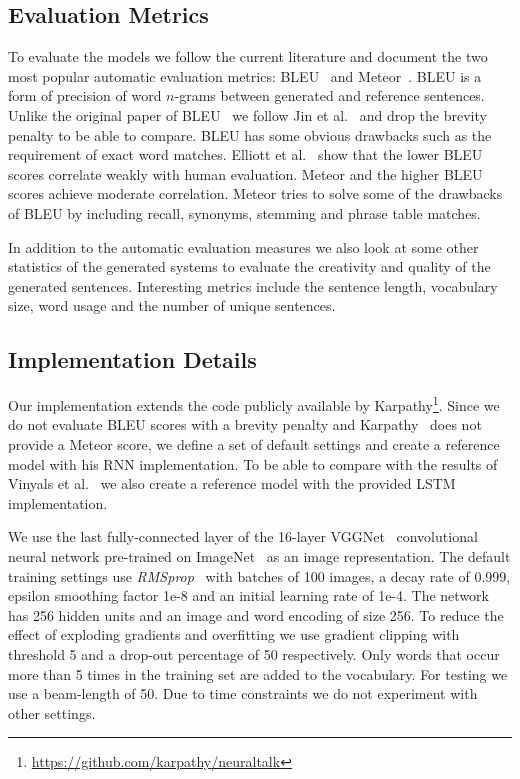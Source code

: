 \documentclass[twoside,twocolumn]{article}
\begin{document}
	\subsection{Evaluation Metrics}
	To evaluate the models we follow the current literature and document the two most popular automatic evaluation metrics: BLEU~\cite{Papineni2002} and Meteor~\cite{Denkowski2007a}. BLEU is a form of precision of word $n$-grams between generated and reference sentences. Unlike the original paper of BLEU~\cite{Papineni2002} we follow Jin et al.~\cite{Jin2015} and drop the brevity penalty to be able to compare. BLEU has some obvious drawbacks such as the requirement of exact word matches. Elliott et al.~\cite{Elliott2014} show that the lower BLEU scores correlate weakly with human evaluation. Meteor and the higher BLEU scores achieve moderate correlation. Meteor tries to solve some of the drawbacks of BLEU by including recall, synonyms, stemming and phrase table matches.
	
	In addition to the automatic evaluation measures we also look at some other statistics of the generated systems to evaluate the creativity and quality of the generated sentences.
	Interesting metrics include the sentence length, vocabulary size, word usage and the number of unique sentences.
	
	\subsection{Implementation Details}
	
	Our implementation extends the code publicly available by Karpathy\footnote{\url{https://github.com/karpathy/neuraltalk}}.
	Since we do not evaluate BLEU scores with a brevity penalty and Karpathy~\cite{Karpathy2015} does not provide a Meteor score, we define a set of default settings and create a reference model with his RNN implementation.
	To be able to compare with the results of Vinyals et al.~\cite{Google} we also create a reference model with the provided LSTM implementation.
	
	We use the last fully-connected layer of the 16-layer VGGNet~\cite{Arge2015} convolutional neural network pre-trained on ImageNet~\cite{Russakovsky2014} as an image representation.
	The default training settings use \emph{RMSprop}~\cite{RMSprop} with batches of 100 images, a decay rate of 0.999, epsilon smoothing factor 1e-8 and an initial learning rate of 1e-4. The network has 256 hidden units and an image and word encoding of size 256.
	To reduce the effect of exploding gradients and overfitting we use gradient clipping with threshold 5 and a drop-out percentage of 50 respectively.
	Only words that occur more than 5 times in the training set are added to the vocabulary. For testing we use a beam-length of 50.
	Due to time constraints we do not experiment with other settings.
	
\end{document}
